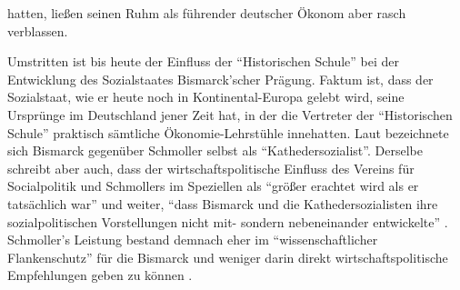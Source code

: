 hatten, ließen seinen Ruhm als führender deutscher Ökonom aber rasch verblassen.    

Umstritten ist bis heute der Einfluss der "`Historischen Schule"' bei der Entwicklung des Sozialstaates Bismarck'scher Prägung. Faktum ist, dass der Sozialstaat, wie er heute noch in Kontinental-Europa gelebt wird, seine Ursprünge im Deutschland jener Zeit hat, in der die Vertreter der "`Historischen Schule"' praktisch sämtliche Ökonomie-Lehrstühle innehatten. Laut \textcite[S. 103]{Winkel1989} bezeichnete sich Bismarck gegenüber Schmoller selbst als "`Kathedersozialist"'. Derselbe schreibt aber auch, dass der wirtschaftspolitische Einfluss des Vereins für Socialpolitik und Schmollers im Speziellen als "`größer erachtet wird als er tatsächlich war"' \parencite[S. 113]{Winkel1989} und weiter, "`dass Bismarck und die Kathedersozialisten ihre sozialpolitischen Vorstellungen nicht  mit- sondern nebeneinander entwickelte"' \parencite[S. 114]{Winkel1989}. Schmoller's Leistung bestand demnach eher im "`wissenschaftlicher Flankenschutz"' für die Bismarck und weniger darin direkt wirtschaftspolitische Empfehlungen geben zu können \parencite[S. 117]{Winkel1989}.

